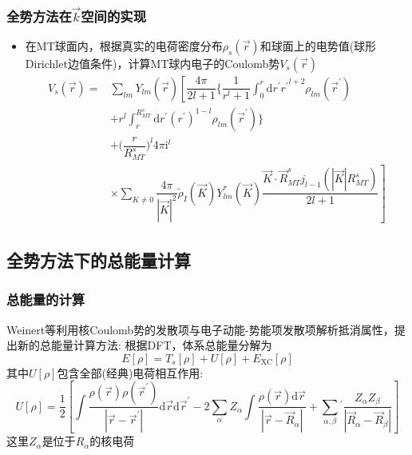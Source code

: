 {\frame
{
	\frametitle{全势方法在$\vec k$空间的实现}
\begin{itemize}
	\item 在\textrm{MT}球面内，根据真实的电荷密度分布$\rho_s(\vec r)$和球面上的电势值(球形\textrm{Dirichlet}边值条件)，计算\textrm{MT}球内电子的\textrm{Coulomb}势$V_s(\vec r)$
		\begin{displaymath}
			\begin{aligned}
				V_s(\vec r)=&\sum_{lm}Y_{lm}(\hat{\vec r})\left[\dfrac{4\pi}{2l+1}\bigg\{\dfrac1{r^l+1}\int_0^r\mathrm{d}r^{\prime}{r^{\prime}}^{l+2}\rho_{lm}(\vec r^{\prime})\right.\\
					&+r^l\int_r^{R_{MT}^s}\mathrm{d}r^{\prime}(r^{\prime})^{1-l}\rho_{lm}(\vec r^{\prime})\bigg\}\\
					&+\bigg(\dfrac r{R_{MT}^s}\bigg)^l4\pi\mathrm{i}^l\\
					&\times\sum_{K\neq0}\left.\dfrac{4\pi}{|\vec K|^2}\tilde\rho_I(\vec K)Y_{lm}^{\ast}(\vec K)\dfrac{\vec K\cdot\vec R_{MT}^sj_{l-1}(|\vec K|R_{MT}^s)}{2l+1}\right]
			\end{aligned}
		\end{displaymath}
\end{itemize}
}

\subsection{全势方法下的总能量计算}
\frame
{
	\frametitle{总能量的计算}
	\textrm{Weinert}等利用核\textrm{Coulomb}势的发散项与电子动能-势能项发散项解析抵消属性，提出新的总能量计算方法:
	根据\textrm{DFT}，体系总能量分解为
	\begin{displaymath}
		E[\rho]=T_s[\rho]+U[\rho]+E_{\mathrm{XC}}[\rho]
	\end{displaymath}
	其中$U[\rho]$包含全部(经典)电荷相互作用:~
	\begin{displaymath}
		U[\rho]=\dfrac12\left[\int\dfrac{\rho(\vec r)\rho(\vec r^{\prime})}{|\vec r-\vec r^{\prime}|}\mathrm{d}\vec r\mathrm{d}\vec r^{\prime}-2\sum_{\alpha}Z_{\alpha}\int\dfrac{\rho(\vec r)\mathrm{d}\vec r}{|\vec r-\vec R_{\alpha}|}+\sum_{\alpha,\beta}{}^{\prime}\dfrac{Z_{\alpha}Z_{\beta}}{|\vec R_{\alpha}-\vec R_{\beta}|}\right]
	\end{displaymath}
	这里$Z_{\alpha}$是位于$R_{\alpha}$的核电荷
}

}
